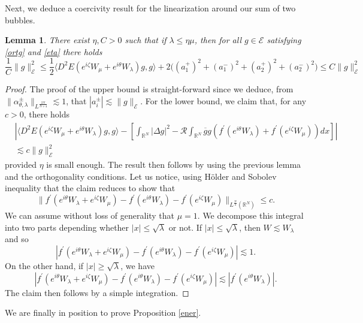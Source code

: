 \documentclass[a4paper,two-side,10pt]{amsart}
\newtheorem{lem}{Lemma}[section]
\newcommand{\R}{\mathbb{R}}
\numberwithin{equation}{section}
\begin{document}
Next, we deduce a coercivity result for the linearization around our sum of two bubbles.
\begin{lem}
\label{lemener3}
There exist $\eta ,C>0$ such that if $\lambda \leq \eta \mu$, then for all $g\in \mathcal{E}$ satisfying \eqref{ortg} and \eqref{eta} 
 there holds
$$\frac{1}{C} \|g\|_{\mathcal{E}}^2 \leq \frac{1}{2} \langle D^2 E (e^{i\zeta}W_\mu +e^{i\theta} W_\lambda )g,g\rangle +2 \big((a_1^+)^2 + (a_1^-)^2 +(a_2^+)^2 +(a_2^-)^2\big)\leq C \|g\|_{\mathcal{E}}^2$$
\end{lem}
\begin{proof}
The proof of the upper bound is straight-forward since we deduce, from $\|\alpha_{\theta , \lambda}^\pm\|_{L^{\frac{2N}{N+4}}}\lesssim 1$, that $|a_i^\pm |\lesssim \|g\|_{\mathcal{E}}$. For the lower bound, we claim that, for any $c>0$, there holds
\begin{align*}
& | \langle D^2 E (e^{i\zeta}W_\mu +e^{i\theta} W_\lambda )g,g\rangle  -[ \int_{\R^N} |\Delta g|^2 -\mathcal{R}\int_{\R^N}\overline{g} g (f^\prime (e^{i\theta} W_\lambda) +f^\prime (e^{i\zeta} W_\mu ) ) dx] |  \\
&\lesssim c \|g\|^2_{\mathcal{E}}
\end{align*}
provided $\eta$ is small enough. The result then follows by using the previous lemma and the orthogonality conditions. Let us notice, using H\" older and Sobolev inequality that the claim reduces to show that
$$\|f^\prime (e^{i\theta} W_\lambda + e^{i\zeta} W_\mu )  - f^\prime (e^{i\theta} W_\lambda) - f^\prime (e^{i\zeta} W_\mu )  \|_{L^{\frac{N}{4}}(\R^N) }\leq c.  $$
We can assume without loss of generality that $\mu=1$. We decompose this integral into two parts depending whether $|x|\leq \sqrt{\lambda}$ or not. If $|x|\leq \sqrt{\lambda}$, then $W\lesssim W_\lambda$ and so
$$|f^\prime (e^{i\theta} W_\lambda + e^{i\zeta} W_\mu )  - f^\prime (e^{i\theta} W_\lambda) - f^\prime (e^{i\zeta} W_\mu )| \lesssim 1. $$
On the other hand, if $|x|\geq \sqrt{\lambda}$, we have
$$|f^\prime (e^{i\theta} W_\lambda + e^{i\zeta} W_\mu )  - f^\prime (e^{i\theta} W_\lambda) - f^\prime (e^{i\zeta} W_\mu )| \lesssim  |f^\prime (e^{i\theta} W_\lambda)|. $$
The claim then follows by a simple integration.
\end{proof}
We are finally in position to prove Proposition \ref{ener}.
\end{document}
